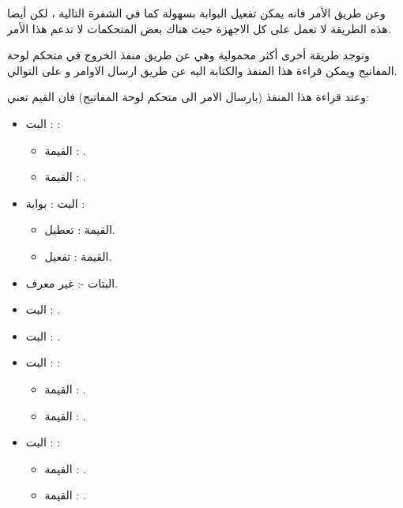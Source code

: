 \documentclass[document.tex]{subfiles}
\begin{document}
وعن طريق الأمر  فانه يمكن تفعيل البوابة  بسهولة كما في الشفرة التالية ، لكن أيضا هذه الطريقة لا تعمل على كل الاجهزة حيث هناك بعض المتحكمات لا تدعم هذا الأمر.

\begin{english}
\lstset{numberstyle=\tiny,numbersep=5pt,tabsize=2,extendedchars=true,breaklines=true,frame=b,showspaces=false, showtabs=false,xleftmargin=10pt,framexleftmargin=10pt,framexrightmargin=5pt,framexbottommargin=4pt,showstringspaces=false,language=[x86masm]Assembler}


\end{english}

وتوجد طريقة أخرى أكثر محمولية وهي عن طريق منفذ الخروج  في متحكم لوحة المفاتيح ويمكن قراءة هذا المنفذ والكتابة اليه عن طريق ارسال الاوامر  و  على التوالي.

وعند قراءة هذا المنفذ (بارسال الامر  الى متحكم لوحة المفاتيح) فان القيم تعني:

\begin{itemize}
\item البت : :
\begin{itemize}
\item القيمة : .
\item القيمة : .
\end{itemize}

\item البت : بوابة :
\begin{itemize}
\item القيمة : تعطيل.
\item القيمة : تفعيل.
\end{itemize}

\item البتات -: غير معرف.
\item البت : .
\item البت : .
\item البت : :
\begin{itemize}
\item القيمة : .
\item القيمة : .
\end{itemize}

\item البت : :
\begin{itemize}
\item القيمة : .
\item القيمة : .
\end{itemize}
\end{itemize}
\end{document}

